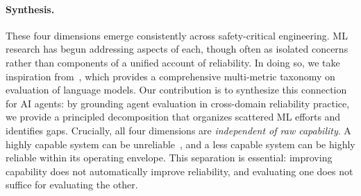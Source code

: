 \documentclass[11pt]{article}
\newcounter{dimension}
\begin{document}
\paragraph{Synthesis.}
These four dimensions emerge consistently across safety-critical engineering. ML research has begun addressing aspects of each, though often as isolated concerns rather than components of a unified account of reliability. In doing so, we take inspiration from~\citet{liang2022holistic}, which provides a comprehensive multi-metric taxonomy on evaluation of language models. Our contribution is to synthesize this connection for AI agents: by grounding agent evaluation in cross-domain reliability practice, we provide a principled decomposition that organizes scattered ML efforts and identifies gaps.
Crucially, all four dimensions are \emph{independent of raw capability}. A highly capable system can be unreliable~\citep{zhou2024larger}, and a less capable system can be highly reliable within its operating envelope.
This separation is essential: improving capability does not automatically improve reliability, and evaluating one does not suffice for evaluating the other.
\end{document}
